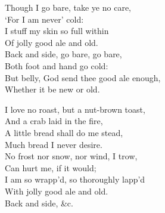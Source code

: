 \settowidth{\versewidth}{But belly, God send thee good ale enough,}
\begin{dcverse}\begin{altverse}
Though I go bare, take ye no care,\\
‘For I am never’ cold:\\
I stuff my skin so full within\\
Of jolly good ale and old.\\
Back and side, go bare, go bare,\\
Both foot and hand go cold:\\
But belly, God send thee good ale enough,\\
Whether it be new or old.
\end{altverse}

\begin{altverse}
I love no roast, but a nut-brown toast,\\
And a crab laid in the fire,\\
A little bread shall do me stead,\\
Much bread I never desire.\\
No frost nor snow, nor wind, I trow,\\
Can hurt me, if it would;\\
I am so wrapp’d, so thoroughly lapp’d\\
With jolly good ale and old.\\
\hspace{6em}Back and side, \&c.
\end{altverse}
\end{dcverse}
\pagebreak

